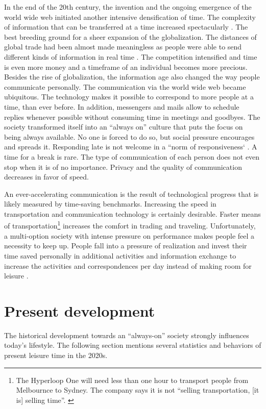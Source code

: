 \documentclass[12pt,numbers=noenddot,parskip,bibliography=totocnumbered,listof=totocnumbered,draft]{scrreprt}
\begin{document}
In the end of the 20th century, the invention and the ongoing emergence of the world wide web initiated another intensive densification of time. The complexity of information that can be transferred at a time increased spectacularly \citep[p.45]{wajcman2014}. The best breeding ground for a sheer expansion of the globalization. The distances of global trade had been almost made meaningless as people were able to send different kinds of information in real time \citep[p.17]{wajcman2014}. The competition intensified and time is even more money and a timeframe of an individual becomes more precious. Besides the rise of globalization, the information age also changed the way people communicate personally. The communication via the world wide web became ubiquitous. The technology makes it possible to correspond to more people at a time, than ever before. In addition, messengers and mails allow to schedule replies whenever possible without consuming time in meetings and goodbyes. The society transformed itself into an ``always on'' culture that puts the focus on being always available. No one is forced to do so, but social pressure encourages and spreads it. Responding late is not welcome in a ``norm of responsiveness` \citep[p.96]{wajcman2014}. A time for a break is rare. The type of communication of each person does not even stop when it is of no importance. Privacy and the quality of communication decreases in favor of speed.

An ever-accelerating communication is the result of technological progress that is likely measured by time-saving benchmarks. Increasing the speed in transportation and communication technology is certainly desirable. Faster means of transportation\footnote{The Hyperloop One will need less than one hour to transport people from Melbournce to Sydney. The company says it is not ``selling transportation, [it is] selling time''. \cite{hyperloop2017}} increases the comfort in trading and traveling. Unfortunately, a multi-option society with intense pressure on performance makes people feel a necessity to keep up. People fall into a pressure of realization and invest their time saved personally in additional activities and information exchange to increase the activities and correspondences per day instead of making room for leisure \citep[p.27-30]{gross1994}.

\section{Present development}
The historical development towards an ``always-on'' society strongly influences today's lifestyle. The following section mentions several statistics and behaviors of present leisure time in the 2020s.
\end{document}
